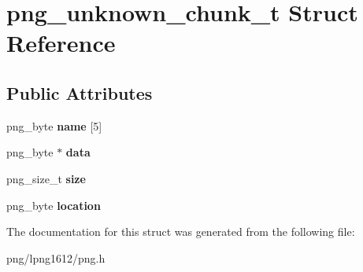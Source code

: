 \hypertarget{structpng__unknown__chunk__t}{\section{png\+\_\+unknown\+\_\+chunk\+\_\+t Struct Reference}
\label{structpng__unknown__chunk__t}
}
\subsection*{Public Attributes}
\begin{DoxyCompactItemize}
\item 
\hypertarget{structpng__unknown__chunk__t_aed965186b30a6f15541d20d7dd8a6849}{png\+\_\+byte {\bfseries name} \mbox{[}5\mbox{]}}\label{structpng__unknown__chunk__t_aed965186b30a6f15541d20d7dd8a6849}

\item 
\hypertarget{structpng__unknown__chunk__t_a4f37f6acbe4e2c287078bcdf03d8ee92}{png\+\_\+byte $\ast$ {\bfseries data}}\label{structpng__unknown__chunk__t_a4f37f6acbe4e2c287078bcdf03d8ee92}

\item 
\hypertarget{structpng__unknown__chunk__t_a0a691245e0c04f01ecf767f215b6a652}{png\+\_\+size\+\_\+t {\bfseries size}}\label{structpng__unknown__chunk__t_a0a691245e0c04f01ecf767f215b6a652}

\item 
\hypertarget{structpng__unknown__chunk__t_af56bfc32223b97fbcb6bd29ba7a1cc29}{png\+\_\+byte {\bfseries location}}\label{structpng__unknown__chunk__t_af56bfc32223b97fbcb6bd29ba7a1cc29}

\end{DoxyCompactItemize}


The documentation for this struct was generated from the following file\+:\begin{DoxyCompactItemize}
\item 
png/lpng1612/png.\+h\end{DoxyCompactItemize}
